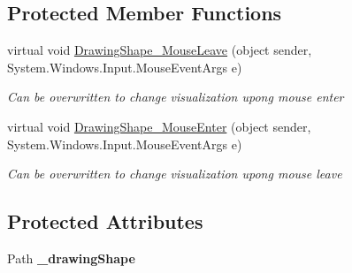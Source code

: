 \subsection*{Protected Member Functions}
\begin{DoxyCompactItemize}
\item 
virtual void \hyperlink{class_w_p_f_visualization_base_1_1_drawing_object_a8e8a0c4b07e701d270826bf2e5de7937}{Drawing\+Shape\+\_\+\+Mouse\+Leave} (object sender, System.\+Windows.\+Input.\+Mouse\+Event\+Args e)
\begin{DoxyCompactList}\small\item\em Can be overwritten to change visualization upong mouse enter \end{DoxyCompactList}\item 
virtual void \hyperlink{class_w_p_f_visualization_base_1_1_drawing_object_a5043a051a86a30b25a1087bc22e8a742}{Drawing\+Shape\+\_\+\+Mouse\+Enter} (object sender, System.\+Windows.\+Input.\+Mouse\+Event\+Args e)
\begin{DoxyCompactList}\small\item\em Can be overwritten to change visualization upong mouse leave \end{DoxyCompactList}\end{DoxyCompactItemize}
\subsection*{Protected Attributes}
\begin{DoxyCompactItemize}
\item 
Path {\bfseries \+\_\+drawing\+Shape}\hypertarget{class_w_p_f_visualization_base_1_1_drawing_object_ab803842f12d2caf6b2b63ff9642b8ba2}{}\label{class_w_p_f_visualization_base_1_1_drawing_object_ab803842f12d2caf6b2b63ff9642b8ba2}

\end{DoxyCompactItemize}
